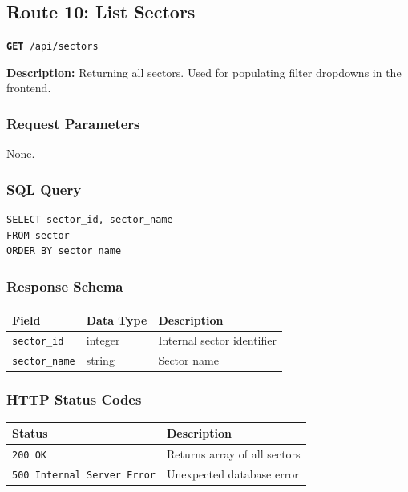 \documentclass[11pt]{article}
\newcommand{\route}[2]{\texttt{\textcolor{routecolor}{\textbf{#1}}~#2}}
\begin{document}
\newpage
\subsection{Route 10: List Sectors}

\route{GET}{/api/sectors}

\medskip\noindent
\textbf{Description:} Returning all sectors. Used for populating filter dropdowns in the frontend.

\subsubsection*{Request Parameters}

None.

\subsubsection*{SQL Query}
\begin{lstlisting}[style=sql,basicstyle=\ttfamily\scriptsize]
SELECT sector_id, sector_name
FROM sector
ORDER BY sector_name
\end{lstlisting}

\subsubsection*{Response Schema}

\begin{center}
\small
\begin{tabular}{l l p{7cm}}
\toprule
\textbf{Field} & \textbf{Data Type} & \textbf{Description} \\
\midrule
\texttt{sector\_id}   & integer & Internal sector identifier \\
\texttt{sector\_name} & string  & Sector name \\
\bottomrule
\end{tabular}
\end{center}

\subsubsection*{HTTP Status Codes}

\begin{center}
\small
\begin{tabular}{l p{8cm}}
\toprule
\textbf{Status} & \textbf{Description} \\
\midrule
\texttt{200 OK} & Returns array of all sectors \\
\texttt{500 Internal Server Error} & Unexpected database error \\
\bottomrule
\end{tabular}
\end{center}
\end{document}
